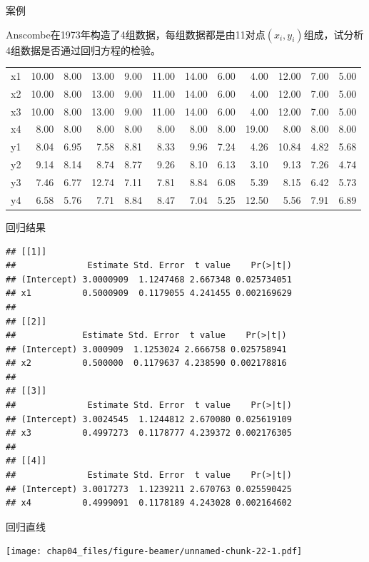 \documentclass[ignorenonframetext,]{beamer}
\begin{document}
\begin{frame}{案例}

Anscombe在1973年构造了4组数据，每组数据都是由11对点\((x_i,y_i)\)组成，试分析4组数据是否通过回归方程的检验。

\begin{longtable}[]{@{}lrrrrrrrrrrr@{}}
\toprule
\endhead
x1 & 10.00 & 8.00 & 13.00 & 9.00 & 11.00 & 14.00 & 6.00 & 4.00 & 12.00 &
7.00 & 5.00\tabularnewline
x2 & 10.00 & 8.00 & 13.00 & 9.00 & 11.00 & 14.00 & 6.00 & 4.00 & 12.00 &
7.00 & 5.00\tabularnewline
x3 & 10.00 & 8.00 & 13.00 & 9.00 & 11.00 & 14.00 & 6.00 & 4.00 & 12.00 &
7.00 & 5.00\tabularnewline
x4 & 8.00 & 8.00 & 8.00 & 8.00 & 8.00 & 8.00 & 8.00 & 19.00 & 8.00 &
8.00 & 8.00\tabularnewline
y1 & 8.04 & 6.95 & 7.58 & 8.81 & 8.33 & 9.96 & 7.24 & 4.26 & 10.84 &
4.82 & 5.68\tabularnewline
y2 & 9.14 & 8.14 & 8.74 & 8.77 & 9.26 & 8.10 & 6.13 & 3.10 & 9.13 & 7.26
& 4.74\tabularnewline
y3 & 7.46 & 6.77 & 12.74 & 7.11 & 7.81 & 8.84 & 6.08 & 5.39 & 8.15 &
6.42 & 5.73\tabularnewline
y4 & 6.58 & 5.76 & 7.71 & 8.84 & 8.47 & 7.04 & 5.25 & 12.50 & 5.56 &
7.91 & 6.89\tabularnewline
\bottomrule
\end{longtable}

\end{frame}

\begin{frame}[fragile]{回归结果}

\begin{verbatim}
## [[1]]
##              Estimate Std. Error  t value    Pr(>|t|)
## (Intercept) 3.0000909  1.1247468 2.667348 0.025734051
## x1          0.5000909  0.1179055 4.241455 0.002169629
## 
## [[2]]
##             Estimate Std. Error  t value    Pr(>|t|)
## (Intercept) 3.000909  1.1253024 2.666758 0.025758941
## x2          0.500000  0.1179637 4.238590 0.002178816
## 
## [[3]]
##              Estimate Std. Error  t value    Pr(>|t|)
## (Intercept) 3.0024545  1.1244812 2.670080 0.025619109
## x3          0.4997273  0.1178777 4.239372 0.002176305
## 
## [[4]]
##              Estimate Std. Error  t value    Pr(>|t|)
## (Intercept) 3.0017273  1.1239211 2.670763 0.025590425
## x4          0.4999091  0.1178189 4.243028 0.002164602
\end{verbatim}

\end{frame}

\begin{frame}{回归直线}

\texttt{[image: chap04\_files/figure-beamer/unnamed-chunk-22-1.pdf]}

\end{frame}
\end{document}
